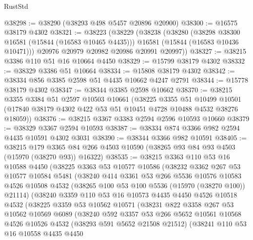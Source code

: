 \begin{lexlean}{RustStd}
\begin{coremodule}
@38298 := @38290 (@38293 @498 @5457 @20896 @20900)
@38300 := @16575 @38179 @4302
@38321 := @38223
    (@38229
      (@38238
        (@38280
          (@38298 @38300 @16581 (@15844 (@16583 @10465 @4435)))
          @16581
          (@15844 (@16583 @10436 @10471)))
        @20976
        @20979
        @20982
        @20986
        @20991
        @20997))
@38327 := @38215 @3386 @110 @51 @16 @10664 @4450
@38329 := @15799 @38179 @4302
@38332 := @38329 @3386 @51 @10664
@38334 := @15808 @38179 @4302
@38342 := @38334 @856 @3385 @2598 @51 @4435 @10662 @4247 @2791
@38344 := @15778 @38179 @4302
@38347 := @38344 @3385 @2598 @10662
@38370 := @38215
    @3355
    @3384
    @51
    @2597
    @10503
    @10661
    (@38225
      @3355
      @51
      @10499
      @10501
      (@17840 @38179 @4302 @422 @53 @51 @10451 @4728 @10488 @4532 @38276 @18059))
@38376 := @38215 @3367 @3383 @2594 @2596 @10593 @10660
@38379 := @38329 @3367 @2594 @10593
@38387 := @38334 @874 @3366 @982 @2594 @4435 @10591 @4302 @3031
@38390 := @38344 @3366 @982 @10591
@38405 := @38215
    @179
    @3365
    @84
    @266
    @4503
    @10590
    (@38265 @93 @84 @93 @4503 (@15970 (@38270 @93)) @16322)
@38535 := @38215
    @3363
    @110
    @53
    @16
    @10588
    @4450
    (@38225
      @3363
      @53
      @10577
      @10586
      (@38232
        @3362
        @267
        @53
        @10577
        @10584
        @5481
        (@38240
          @414
          @3361
          @53
          @266
          @5536
          @10576
          @10583
          @4526
          @10508
          @4532
          (@38265 @100 @53 @100 @5536 (@15970 (@38270 @100)) @21114)
          (@38240
            @3359
            @110
            @53
            @16
            @10573
            @4435
            @4450
            @4526
            @10518
            @4532
            (@38225
              @3359
              @53
              @10562
              @10571
              (@38231
                @822
                @3358
                @267
                @53
                @10562
                @10569
                @6089
                (@38240
                  @592
                  @3357
                  @53
                  @266
                  @5652
                  @10561
                  @10568
                  @4526
                  @10526
                  @4532
                  (@38293 @591 @5652 @21508 @21512)
                  (@38241
                    @110
                    @53
                    @16
                    @10558
                    @4435
                    @4450

\end{coremodule}
\end{lexlean}
